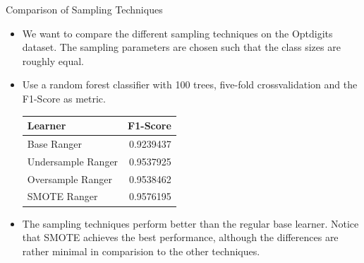 \documentclass[11pt,compress,t,notes=noshow, xcolor=table]{beamer}
\begin{document}
 	\begin{frame}{Comparison of Sampling Techniques}

		\small

		\begin{itemize}
		
			\item We want to compare the different sampling techniques on the Optdigits dataset. The sampling parameters are chosen such that 
                the class sizes are roughly equal.
		
			\item Use a random forest classifier with 100 trees, five-fold crossvalidation and the F1-Score as metric.
\begin{center}
\begin{tabular}{lr}
\toprule
Learner & F1-Score\\
\midrule
Base Ranger & 0.9239437\\
Undersample Ranger & 0.9537925\\
Oversample Ranger & 0.9538462\\
SMOTE Ranger & 0.9576195\\
\bottomrule
\end{tabular}    
\end{center}


			\item The sampling techniques perform better than the regular base learner. Notice that SMOTE achieves the best performance, although the differences are rather minimal in comparision to the other techniques.

		\end{itemize}		

	\end{frame}


	\endlecture
\end{document}
